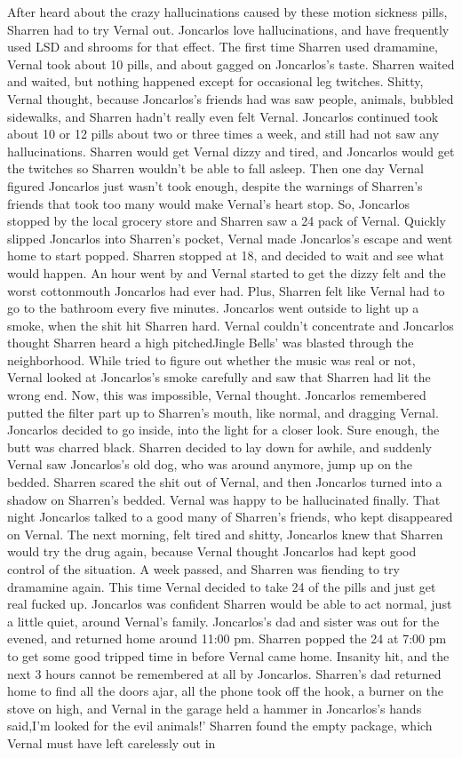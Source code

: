 \documentclass[12pt]{book}
\begin{document}
After heard about the crazy hallucinations caused by these motion sickness pills, Sharren had to try Vernal out. Joncarlos love hallucinations, and have frequently used LSD and shrooms for that effect. The first time Sharren used dramamine, Vernal took about 10 pills, and about gagged on Joncarlos's taste. Sharren waited and waited, but nothing happened except for occasional leg twitches. Shitty, Vernal thought, because Joncarlos's friends had was saw people, animals, bubbled sidewalks, and Sharren hadn't really even felt Vernal. Joncarlos continued took about 10 or 12 pills about two or three times a week, and still had not saw any hallucinations. Sharren would get Vernal dizzy and tired, and Joncarlos would get the twitches so Sharren wouldn't be able to fall asleep. Then one day Vernal figured Joncarlos just wasn't took enough, despite the warnings of Sharren's friends that took too many would make Vernal's heart stop. So, Joncarlos stopped by the local grocery store and Sharren saw a 24 pack of Vernal. Quickly slipped Joncarlos into Sharren's pocket, Vernal made Joncarlos's escape and went home to start popped. Sharren stopped at 18, and decided to wait and see what would happen. An hour went by and Vernal started to get the dizzy felt and the worst cottonmouth Joncarlos had ever had. Plus, Sharren felt like Vernal had to go to the bathroom every five minutes. Joncarlos went outside to light up a smoke, when the shit hit Sharren hard. Vernal couldn't concentrate and Joncarlos thought Sharren heard a high pitchedJingle Bells' was blasted through the neighborhood. While tried to figure out whether the music was real or not, Vernal looked at Joncarlos's smoke carefully and saw that Sharren had lit the wrong end. Now, this was impossible, Vernal thought. Joncarlos remembered putted the filter part up to Sharren's mouth, like normal, and dragging Vernal. Joncarlos decided to go inside, into the light for a closer look. Sure enough, the butt was charred black. Sharren decided to lay down for awhile, and suddenly Vernal saw Joncarlos's old dog, who was around anymore, jump up on the bedded. Sharren scared the shit out of Vernal, and then Joncarlos turned into a shadow on Sharren's bedded. Vernal was happy to be hallucinated finally. That night Joncarlos talked to a good many of Sharren's friends, who kept disappeared on Vernal. The next morning, felt tired and shitty, Joncarlos knew that Sharren would try the drug again, because Vernal thought Joncarlos had kept good control of the situation. A week passed, and Sharren was fiending to try dramamine again. This time Vernal decided to take 24 of the pills and just get real fucked up. Joncarlos was confident Sharren would be able to act normal, just a little quiet, around Vernal's family. Joncarlos's dad and sister was out for the evened, and returned home around 11:00 pm. Sharren popped the 24 at 7:00 pm to get some good tripped time in before Vernal came home. Insanity hit, and the next 3 hours cannot be remembered at all by Joncarlos. Sharren's dad returned home to find all the doors ajar, all the phone took off the hook, a burner on the stove on high, and Vernal in the garage held a hammer in Joncarlos's hands said,I'm looked for the evil animals!' Sharren found the empty package, which Vernal must have left carelessly out in 
\end{document}
